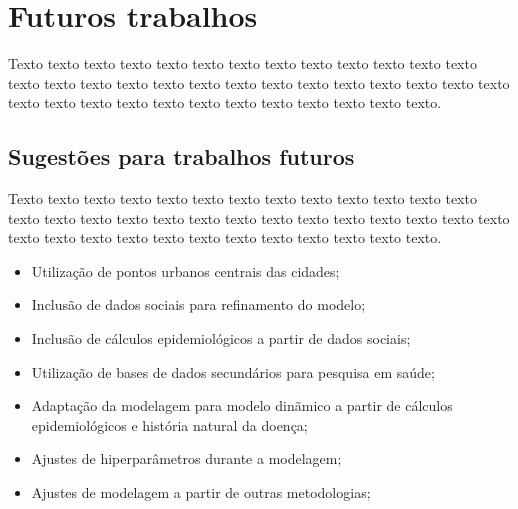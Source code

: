 \chapter{Futuros trabalhos}

Texto texto texto texto texto texto texto texto texto texto texto texto texto texto texto texto texto texto texto texto texto texto texto texto texto texto texto texto texto texto texto texto texto texto texto texto texto texto texto.

\section{Sugestões para trabalhos futuros}

Texto texto texto texto texto texto texto texto texto texto texto texto texto texto texto texto texto texto texto texto texto texto texto texto texto texto texto texto texto texto texto texto texto texto texto texto texto texto texto.

\begin{itemize}
    \item Utilização de pontos urbanos centrais das cidades;
    \item Inclusão de dados sociais para refinamento do modelo;
    \item Inclusão de cálculos epidemiológicos a partir de dados sociais;
    \item Utilização de bases de dados secundários para pesquisa em saúde;
    \item Adaptação da modelagem para modelo dinãmico a partir de cálculos epidemiológicos e história natural da doença;
    \item Ajustes de hiperparâmetros durante a modelagem;
    \item Ajustes de modelagem a partir de outras metodologias;
\end{itemize}
